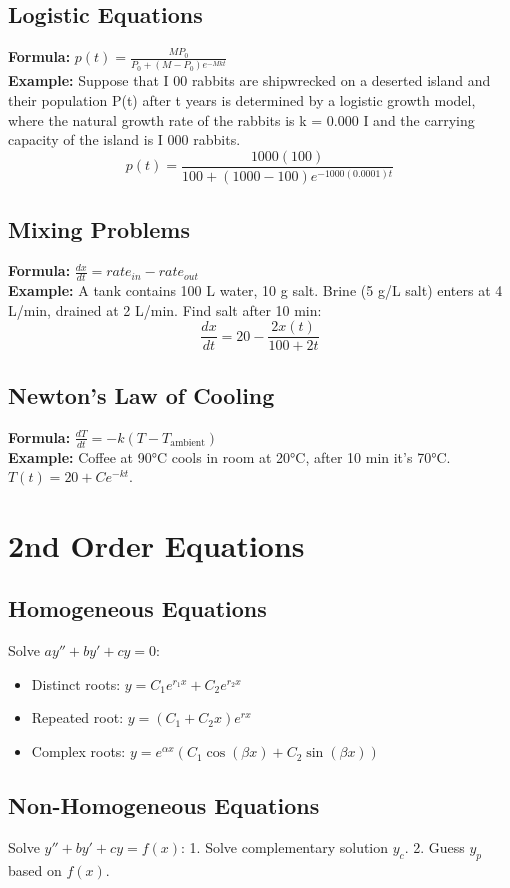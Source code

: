 \begin{multicols}{2}
\subsection*{Logistic Equations}
\textbf{Formula:} 
\( p(t) = \frac{MP_0}{P_0 + (M-P_0)e^{-Mkt}} \) \\
\textbf{Example:} Suppose that I 00 rabbits are shipwrecked on a deserted island and their population P(t) after t years is
determined by a logistic growth model, where the natural growth rate of the rabbits is k = 0.000 I and the
carrying capacity of the island is I 000 rabbits.
\[ p(t) = \frac{1000(100)}{100 + (1000-100)e^{-1000(0.0001)t}} \]

\subsection*{Mixing Problems}
\textbf{Formula:} 
\( \frac{dx}{dt} = rate_{in} - rate_{out} \) \\
\textbf{Example:} A tank contains 100 L water, 10 g salt. Brine (5 g/L salt) enters at 4 L/min, drained at 2 L/min. Find salt after 10 min:
\[ \frac{dx}{dt} = 20 - \frac{2x(t)}{100 + 2t} \]

\subsection*{Newton's Law of Cooling}
\textbf{Formula:} 
\( \frac{dT}{dt} = -k(T - T_{\text{ambient}}) \) \\
\textbf{Example:} Coffee at 90°C cools in room at 20°C, after 10 min it's 70°C. \( T(t) = 20 + Ce^{-kt} \).

\section*{2nd Order Equations}
\subsection*{Homogeneous Equations}
Solve \( ay'' + by' + cy = 0 \):
\begin{itemize}
    \item Distinct roots: \( y = C_1 e^{r_1 x} + C_2 e^{r_2 x} \)
    \item Repeated root: \( y = (C_1 + C_2x)e^{r x} \)
    \item Complex roots: \( y = e^{\alpha x}(C_1 \cos(\beta x) + C_2 \sin(\beta x)) \)
\end{itemize}

\subsection*{Non-Homogeneous Equations}
Solve \( y'' + by' + cy = f(x) \):
1. Solve complementary solution \( y_c \). 
2. Guess \( y_p \) based on \( f(x) \).


\end{multicols}
